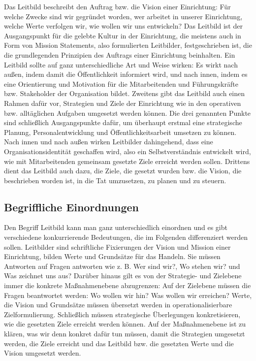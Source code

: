 \documentclass[
  letterpaper,
]{book}
\begin{document}
Das Leitbild beschreibt den Auftrag bzw. die Vision einer Einrichtung:
Für welche Zwecke sind wir gegründet worden, wer arbeitet in unserer
Einrichtung, welche Werte verfolgen wir, wie wollen wir uns entwickeln?
Das Leitbild ist der Ausgangspunkt für die gelebte Kultur in der
Einrichtung, die meistens auch in Form von Mission Statements, also
formulierten Leitbilder, festgeschrieben ist, die die grundlegenden
Prinzipien des Auftrags einer Einrichtung beinhalten. Ein Leitbild
sollte auf ganz unterschiedliche Art und Weise wirken: Es wirkt nach
außen, indem damit die Öffentlichkeit informiert wird, und nach innen,
indem es eine Orientierung und Motivation für die Mitarbeitenden und
Führungskräfte bzw. Stakeholder der Organisation bildet. Zweitens gibt
das Leitbild auch einen Rahmen dafür vor, Strategien und Ziele der
Einrichtung wie in den operativen bzw. alltäglichen Aufgaben umgesetzt
werden können. Die drei genannten Punkte sind schließlich Ausgangspunkte
dafür, um überhaupt erstmal eine strategische Planung,
Personalentwicklung und Öffentlichkeitsarbeit umsetzen zu können. Nach
innen und nach außen wirken Leitbilder dahingehend, dass eine
Organisationsidentität geschaffen wird, also ein Selbstverständnis
entwickelt wird, wie mit Mitarbeitenden gemeinsam gesetzte Ziele
erreicht werden sollen. Drittens dient das Leitbild auch dazu, die
Ziele, die gesetzt wurden bzw. die Vision, die beschrieben worden ist,
in die Tat umzusetzen, zu planen und zu steuern.

\subsection{Begriffliche Einordnungen}\label{begriffliche-einordnungen}

Den Begriff Leitbild kann man ganz unterschiedlich einordnen und es gibt
verschiedene konkurrierende Bedeutungen, die im Folgenden differenziert
werden sollen. Leitbilder sind schriftliche Fixierungen der Vision und
Mission einer Einrichtung, bilden Werte und Grundsätze für das Handeln.
Sie müssen Antworten auf Fragen antworten wie z. B. Wer sind wir?, Wo
stehen wir? und Was zeichnet uns aus? Darüber hinaus gilt es von der
Strategie- und Zielebene immer die konkrete Maßnahmenebene abzugrenzen:
Auf der Zielebene müssen die Fragen beantwortet werden: Wo wollen wir
hin? Was wollen wir erreichen? Werte, die Vision und Grundsätze müssen
übersetzt werden in operationalisierbare Zielformulierung. Schließlich
müssen strategische Überlegungen konkretisieren, wie die gesetzten Ziele
erreicht werden können. Auf der Maßnahmenebene ist zu klären, was wir
denn konkret dafür tun müssen, damit die Strategien umgesetzt werden,
die Ziele erreicht und das Leitbild bzw. die gesetzten Werte und die
Vision umgesetzt werden.
\end{document}
